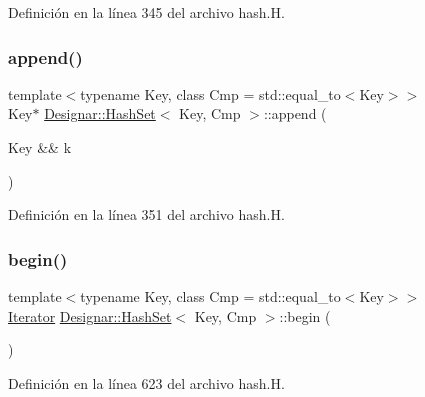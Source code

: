Definición en la línea 345 del archivo hash.\+H.

\mbox{\label{class_designar_1_1_hash_set_a12748f202f35b968b2aace2ebe202f17}} 
\subsubsection{\texorpdfstring{append()}{append()}\hspace{0.1cm}{\footnotesize\ttfamily [2/2]}}
{\footnotesize\ttfamily template$<$typename Key, class Cmp = std\+::equal\+\_\+to$<$\+Key$>$$>$ \\
Key$\ast$ \hyperlink{class_designar_1_1_hash_set}{Designar\+::\+Hash\+Set}$<$ Key, Cmp $>$\+::append (\begin{DoxyParamCaption}\item[{Key \&\&}]{k }\end{DoxyParamCaption})\hspace{0.3cm}{\ttfamily [inline]}}



Definición en la línea 351 del archivo hash.\+H.

\mbox{\label{class_designar_1_1_hash_set_a4fd373db1c3035e5833b59fb6cb1656b}} 
\subsubsection{\texorpdfstring{begin()}{begin()}\hspace{0.1cm}{\footnotesize\ttfamily [1/2]}}
{\footnotesize\ttfamily template$<$typename Key, class Cmp = std\+::equal\+\_\+to$<$\+Key$>$$>$ \\
\hyperlink{class_designar_1_1_hash_set_1_1_iterator}{Iterator} \hyperlink{class_designar_1_1_hash_set}{Designar\+::\+Hash\+Set}$<$ Key, Cmp $>$\+::begin (\begin{DoxyParamCaption}{ }\end{DoxyParamCaption})\hspace{0.3cm}{\ttfamily [inline]}}



Definición en la línea 623 del archivo hash.\+H.

